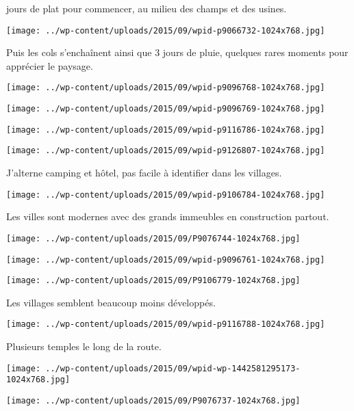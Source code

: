  jours de plat pour commencer, au milieu des champs et des usines.
\begin{center} \texttt{[image: ../wp-content/uploads/2015/09/wpid-p9066732-1024x768.jpg]} \end{center}

 Puis les cols s'enchaînent ainsi que 3 jours de pluie, quelques rares moments pour apprécier le paysage.
\begin{center} \texttt{[image: ../wp-content/uploads/2015/09/wpid-p9096768-1024x768.jpg]} \end{center}
\begin{center} \texttt{[image: ../wp-content/uploads/2015/09/wpid-p9096769-1024x768.jpg]} \end{center}
\begin{center} \texttt{[image: ../wp-content/uploads/2015/09/wpid-p9116786-1024x768.jpg]} \end{center}
\begin{center} \texttt{[image: ../wp-content/uploads/2015/09/wpid-p9126807-1024x768.jpg]} \end{center}

 J'alterne camping et hôtel, pas facile à identifier dans les villages.
\begin{center} \texttt{[image: ../wp-content/uploads/2015/09/wpid-p9106784-1024x768.jpg]} \end{center}

\pagebreak
 Les villes sont modernes avec des grands immeubles en construction partout.
\begin{center} \texttt{[image: ../wp-content/uploads/2015/09/P9076744-1024x768.jpg]} \end{center}
\begin{center} \texttt{[image: ../wp-content/uploads/2015/09/wpid-p9096761-1024x768.jpg]} \end{center}
\begin{center} \texttt{[image: ../wp-content/uploads/2015/09/P9106779-1024x768.jpg]} \end{center}

 Les villages semblent beaucoup moins développés.
\begin{center} \texttt{[image: ../wp-content/uploads/2015/09/wpid-p9116788-1024x768.jpg]} \end{center}

\pagebreak
 Plusieurs temples le long de la route.
\begin{center} \texttt{[image: ../wp-content/uploads/2015/09/wpid-wp-1442581295173-1024x768.jpg]} \end{center}
\begin{center} \texttt{[image: ../wp-content/uploads/2015/09/P9076737-1024x768.jpg]} \end{center}

